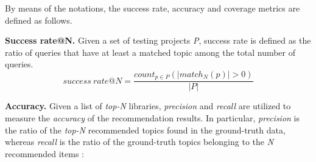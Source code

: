 \noindent By means of the notations, the success rate, accuracy and coverage metrics are defined as follows.  


\vspace{.1cm}
\noindent\textbf{Success rate@N.} Given a set of testing projects \emph{P}, success rate is defined as the ratio of queries that have at least a matched topic among the total number of queries.%
\vspace{-.1cm}
\begin{equation} \label{eqn:RecallRate}
success\ rate@N=\frac{ count_{p \in P}( \left | match_{N}(p) \right | > 0 ) }{\left | P \right |} %
\end{equation}

\vspace{.1cm}
%
%
\noindent \textbf{Accuracy.} Given a list of \emph{top-N} libraries, \emph{precision} and \emph{recall} are utilized to measure the \emph{accuracy} of the recommendation results. In particular,  \emph{precision} is the ratio of the \emph{top-N} recommended topics found in the ground-truth data, whereas \emph{recall} is the ratio of the ground-truth topics belonging to the \emph{N} recommended items \cite{Davis:2006:RPR:1143844.1143874}:%

